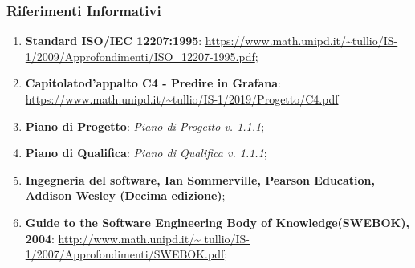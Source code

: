 \subsubsection{Riferimenti Informativi}
\begin{enumerate}
	\item \textbf{Standard ISO/IEC 12207:1995}: 
	\url{https://www.math.unipd.it/~tullio/IS-1/2009/Approfondimenti/ISO_12207-1995.pdf};
	\item \textbf{Capitolato\glosp d'appalto C4 - Predire in Grafana}: \url{https://www.math.unipd.it/~tullio/IS-1/2019/Progetto/C4.pdf}
	\item \textbf{Piano di Progetto}: \textit{Piano di Progetto v. 1.1.1};
	\item \textbf{Piano di Qualifica}: \textit{Piano di Qualifica v. 1.1.1};
	\item \textbf{Ingegneria del software, Ian Sommerville, Pearson Education, Addison Wesley (Decima edizione)};
	\item \textbf{Guide to the Software Engineering Body of Knowledge(SWEBOK), 2004}: \url{http://www.math.unipd.it/~	tullio/IS-1/2007/Approfondimenti/SWEBOK.pdf};

	
	
	
	
	
	
\end{enumerate}


